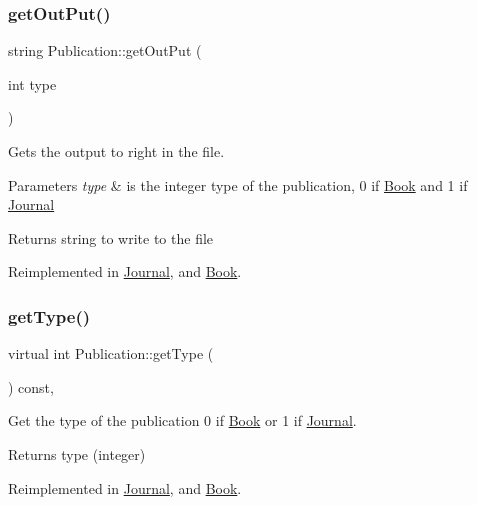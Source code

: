 \subsubsection{\texorpdfstring{get\+Out\+Put()}{getOutPut()}}
{\footnotesize\ttfamily string Publication\+::get\+Out\+Put (\begin{DoxyParamCaption}\item[{int}]{type }\end{DoxyParamCaption})\hspace{0.3cm}{\ttfamily [virtual]}}



Gets the output to right in the file. 


\begin{DoxyParams}{Parameters}
{\em type} & is the integer type of the publication, 0 if \hyperlink{class_book}{Book} and 1 if \hyperlink{class_journal}{Journal}\\
\hline
\end{DoxyParams}
\begin{DoxyReturn}{Returns}
string to write to the file 
\end{DoxyReturn}


Reimplemented in \hyperlink{class_journal_a631e4fa39c9875db342ed8eb1a9f5eb6}{Journal}, and \hyperlink{class_book_ab72570b8b4d902d6f3fe681dc29b2198}{Book}.

\mbox{\label{class_publication_ab0bd9119b29b09fbbe9044016a512407}} 
\subsubsection{\texorpdfstring{get\+Type()}{getType()}}
{\footnotesize\ttfamily virtual int Publication\+::get\+Type (\begin{DoxyParamCaption}{ }\end{DoxyParamCaption}) const\hspace{0.3cm}{\ttfamily [inline]}, {\ttfamily [virtual]}}



Get the type of the publication 0 if \hyperlink{class_book}{Book} or 1 if \hyperlink{class_journal}{Journal}. 

\begin{DoxyReturn}{Returns}
type (integer) 
\end{DoxyReturn}


Reimplemented in \hyperlink{class_journal_ad787716ffbd1d22623245cf98c13ac4a}{Journal}, and \hyperlink{class_book_a285dd3654bfced6baffd86320c39d42e}{Book}.

